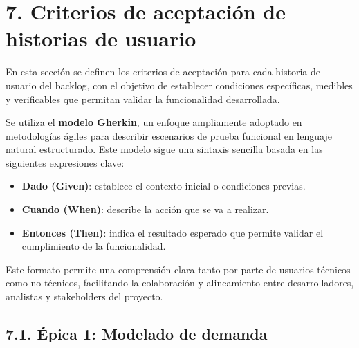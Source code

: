 \documentclass[
11pt, %
]{charter}
\begin{document}
\section{7. Criterios de aceptación de historias de usuario}
\label{sec:criteriosAceptacion}

En esta sección se definen los criterios de aceptación para cada historia de usuario del backlog, con el objetivo de establecer condiciones específicas, medibles y verificables que permitan validar la funcionalidad desarrollada. 

Se utiliza el \textbf{modelo Gherkin}, un enfoque ampliamente adoptado en metodologías ágiles para describir escenarios de prueba funcional en lenguaje natural estructurado. Este modelo sigue una sintaxis sencilla basada en las siguientes expresiones clave:

\begin{itemize}
  \item \textbf{Dado (Given)}: establece el contexto inicial o condiciones previas.
  \item \textbf{Cuando (When)}: describe la acción que se va a realizar.
  \item \textbf{Entonces (Then)}: indica el resultado esperado que permite validar el cumplimiento de la funcionalidad.
\end{itemize}

Este formato permite una comprensión clara tanto por parte de usuarios técnicos como no técnicos, facilitando la colaboración y alineamiento entre desarrolladores, analistas y stakeholders del proyecto.

\subsection*{7.1. Épica 1: Modelado de demanda}
\end{document}
